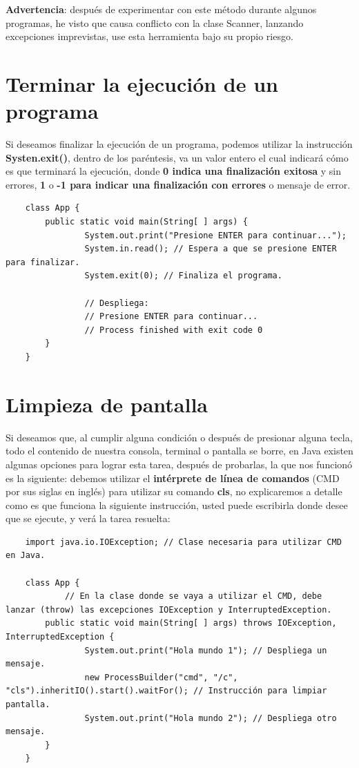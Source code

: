 \textbf{Advertencia}: después de experimentar con este método durante algunos programas, he visto que causa conflicto con la clase Scanner, lanzando excepciones imprevistas, use esta herramienta bajo su propio riesgo.



\section{Terminar la ejecución de un programa}
\hspace{0.55cm}Si deseamos finalizar la ejecución de un programa, podemos utilizar la instrucción \textbf{Systen.exit()}, dentro de los paréntesis, va un valor entero el cual indicará cómo es que terminará la ejecución, donde \textbf{0 indica una finalización exitosa} y sin errores, \textbf{1} o \textbf{-1 para indicar una finalización con errores} o mensaje de error.
\begin{lstlisting}
    class App {
        public static void main(String[ ] args) {
        		System.out.print("Presione ENTER para continuar...");
        		System.in.read(); // Espera a que se presione ENTER para finalizar.
        		System.exit(0); // Finaliza el programa.
        		
        		// Despliega:
        		// Presione ENTER para continuar...
        		// Process finished with exit code 0
        }
    }
\end{lstlisting}



\section{Limpieza de pantalla}
\hspace{0.55cm}Si deseamos que, al cumplir alguna condición o después de presionar alguna tecla, todo el contenido de nuestra consola, terminal o pantalla se borre, en Java existen algunas opciones para lograr esta tarea, después de probarlas, la que nos funcionó es la siguiente: debemos utilizar el \textbf{intérprete de línea de comandos} (CMD por sus siglas en inglés) para utilizar su comando \textbf{cls}, no explicaremos a detalle como es que funciona la siguiente instrucción, usted puede escribirla donde desee que se ejecute, y verá la tarea resuelta:
\begin{lstlisting}
	import java.io.IOException; // Clase necesaria para utilizar CMD en Java.

    class App {
    		// En la clase donde se vaya a utilizar el CMD, debe lanzar (throw) las excepciones IOException y InterruptedException.
        public static void main(String[ ] args) throws IOException, InterruptedException {
        		System.out.print("Hola mundo 1"); // Despliega un mensaje.
        		new ProcessBuilder("cmd", "/c", "cls").inheritIO().start().waitFor(); // Instrucción para limpiar pantalla.
        		System.out.print("Hola mundo 2"); // Despliega otro mensaje.
        }
    }
\end{lstlisting}